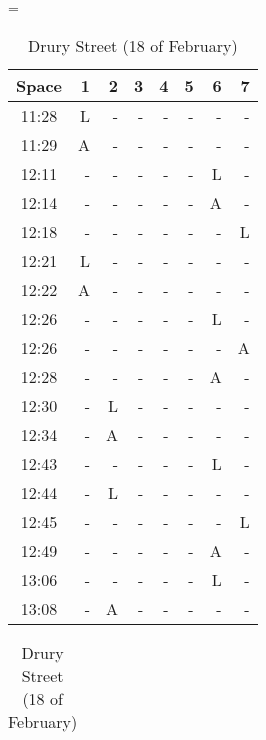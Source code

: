 \begin{table}[H]
    \centering
    \setlength\tabcolsep{4pt}
    \begin{minipage}{0.48\textwidth}
        \centering
        \tablewidth=\textwidth
        \begin{tabular}{|c|r|r|r|r|r|r|r|}
            \hline
            Space & 1 & 2 & 3 & 4 & 5 & 6 & 7 \\
            \hline\hline
            11:28 & L & - & - & - & - & - & - \\ \hline
            11:29 & A & - & - & - & - & - & - \\ \hline
            12:11 & - & - & - & - & - & L & - \\ \hline
            12:14 & - & - & - & - & - & A & - \\ \hline
            12:18 & - & - & - & - & - & - & L \\ \hline
            12:21 & L & - & - & - & - & - & - \\ \hline
            12:22 & A & - & - & - & - & - & - \\ \hline
            12:26 & - & - & - & - & - & L & - \\ \hline
            12:26 & - & - & - & - & - & - & A \\ \hline
            12:28 & - & - & - & - & - & A & - \\ \hline
            12:30 & - & L & - & - & - & - & - \\ \hline
            12:34 & - & A & - & - & - & - & - \\ \hline
            12:43 & - & - & - & - & - & L & - \\ \hline
            12:44 & - & L & - & - & - & - & - \\ \hline
            12:45 & - & - & - & - & - & - & L \\ \hline
            12:49 & - & - & - & - & - & A & - \\ \hline
            13:06 & - & - & - & - & - & L & - \\ \hline
            13:08 & - & A & - & - & - & - & - \\
            \hline
        \end{tabular}
        \caption{Drury Street (18\textwidth{th} of February)}
        \label{table:druryStreet} 
        \end{minipage}%
        \hfill
        \begin{minipage}{0.48\textwidth}
        \centering
        \begin{tabular}{|c|r|r|r|r|r|r|}

\end{tabular}
\end{minipage}
\end{table}
